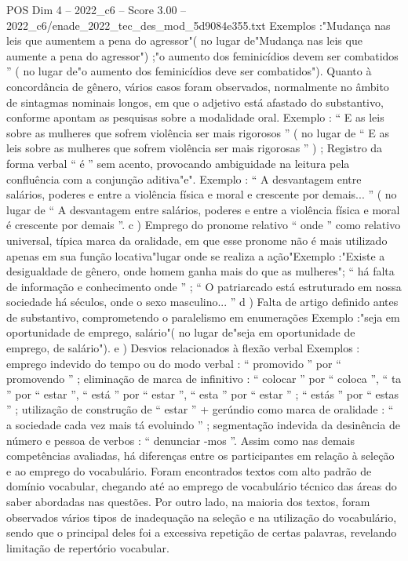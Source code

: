 \begin{textsample}{POS Dim 4 – 2022\_c6 – Score 3.00 – 2022\_c6/enade\_2022\_tec\_des\_mod\_5d9084e355.txt}
Exemplos :"Mudança nas leis que aumentem a pena do agressor"( no lugar de"Mudança nas leis que aumente a pena do agressor") ;"o aumento dos feminicídios devem ser combatidos ” ( no lugar de"o aumento dos feminicídios deve ser combatidos").
Quanto à concordância de gênero, vários casos foram observados, normalmente no âmbito de sintagmas nominais longos, em que o adjetivo está afastado do substantivo, conforme apontam as pesquisas sobre a modalidade oral.
Exemplo : “ E as leis sobre as mulheres que sofrem violência ser mais rigorosos ” ( no lugar de “ E as leis sobre as mulheres que sofrem violência ser mais rigorosas ” ) ; Registro da forma verbal “ é ” sem acento, provocando ambiguidade na leitura pela confluência com a conjunção aditiva"e".
Exemplo : “ A desvantagem entre salários, poderes e entre a violência física e moral e crescente por demais... ” ( no lugar de “ A desvantagem entre salários, poderes e entre a violência física e moral é crescente por demais ”. c ) Emprego do pronome relativo “ onde ” como relativo universal, típica marca da oralidade, em que esse pronome não é mais utilizado apenas em sua função locativa"lugar onde se realiza a ação"Exemplo :"Existe a desigualdade de gênero, onde homem ganha mais do que as mulheres"; “ há falta de informação e conhecimento onde ” ; “ O patriarcado está estruturado em nossa sociedade há séculos, onde o sexo masculino... ” d ) Falta de artigo definido antes de substantivo, comprometendo o paralelismo em enumerações Exemplo :"seja em oportunidade de emprego, salário"( no lugar de"seja em oportunidade de emprego, de salário"). e ) Desvios relacionados à flexão verbal Exemplos : emprego indevido do tempo ou do modo verbal : “ promovido ” por “ promovendo ” ; eliminação de marca de infinitivo : “ colocar ” por “ coloca ”, “ ta ” por “ estar ”, “ está ” por “ estar ”, “ esta ” por “ estar ” ; “ estás ” por “ estas ” ; utilização de construção de “ estar ” + gerúndio como marca de oralidade : “ a sociedade cada vez mais tá evoluindo ” ; segmentação indevida da desinência de número e pessoa de verbos : “ denunciar -mos ”.
Assim como nas demais competências avaliadas, há diferenças entre os participantes em relação à seleção e ao emprego do vocabulário.
Foram encontrados textos com alto padrão de domínio vocabular, chegando até ao emprego de vocabulário técnico das áreas do saber abordadas nas questões.
Por outro lado, na maioria dos textos, foram observados vários tipos de inadequação na seleção e na utilização do vocabulário, sendo que o principal deles foi a excessiva repetição de certas palavras, revelando limitação de repertório vocabular.

\end{textsample}
